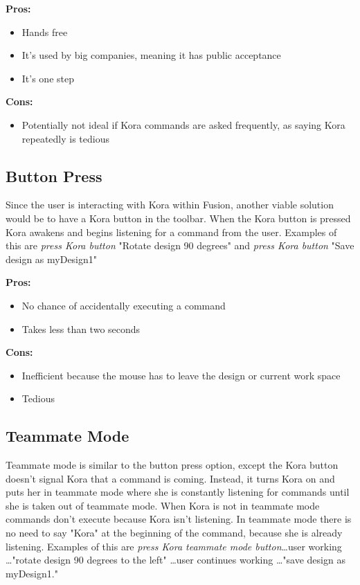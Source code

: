 \documentclass[onecolumn, draftclsnofoot,10pt, compsoc]{IEEEtran}
\begin{document}
			\textbf{Pros:}
				\begin{itemize}
					\item{
						Hands free}
					\item{
						It's used by big companies, meaning it has public acceptance}
					\item{
						It's one step}
				\end{itemize}
				
			\textbf{Cons:}
				\begin{itemize}
					\item{
						Potentially not ideal if Kora commands are asked frequently, as saying Kora repeatedly is tedious}
				\end{itemize}
			
			
		\subsection{Button Press}
			Since the user is interacting with Kora within Fusion, another viable solution would be to have a Kora button in the toolbar.
			When the Kora button is pressed Kora awakens and begins listening for a command from the user.
			Examples of this are \textit{press Kora button} "Rotate design 90 degrees" and  \textit{press Kora button} "Save design as myDesign1"
			
			\textbf{Pros:}
				\begin{itemize}
					\item{
						No chance of accidentally executing a command}
					\item{
						Takes less than two seconds}
				\end{itemize}
			
			\textbf{Cons:}
				\begin{itemize}
					\item{
						Inefficient because the mouse has to leave the design or current work space}
					\item{
						Tedious}
				\end{itemize}
			
			
		\subsection{Teammate Mode}
			Teammate mode is similar to the button press option, except the Kora button doesn't signal Kora that a command is coming. 
			Instead, it turns Kora on and puts her in teammate mode where she is constantly listening for commands until she is taken out of teammate mode.
			When Kora is not in teammate mode commands don't execute because Kora isn't listening.
			In teammate mode there is no need to say "Kora" at the beginning of the command, because she is already listening.
			Examples of this are \textit{press Kora teammate mode button}\dots user working \dots "rotate design 90 degrees to the left" \dots user continues working \dots"save design as myDesign1."
			
\end{document}
